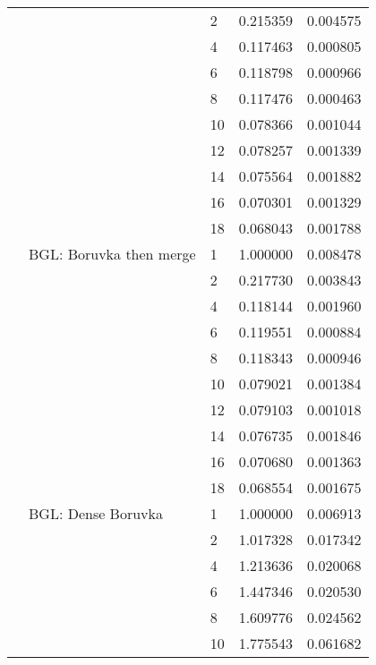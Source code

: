 \begin{tabular}{lllrr}
                      &            & 2  &  0.215359 &  0.004575 \\
                      &            & 4  &  0.117463 &  0.000805 \\
                      &            & 6  &  0.118798 &  0.000966 \\
                      &            & 8  &  0.117476 &  0.000463 \\
                      &            & 10 &  0.078366 &  0.001044 \\
                      &            & 12 &  0.078257 &  0.001339 \\
                      &            & 14 &  0.075564 &  0.001882 \\
                      &            & 16 &  0.070301 &  0.001329 \\
                      &            & 18 &  0.068043 &  0.001788 \\
                      & BGL: Boruvka then merge & 1  &  1.000000 &  0.008478 \\
                      &            & 2  &  0.217730 &  0.003843 \\
                      &            & 4  &  0.118144 &  0.001960 \\
                      &            & 6  &  0.119551 &  0.000884 \\
                      &            & 8  &  0.118343 &  0.000946 \\
                      &            & 10 &  0.079021 &  0.001384 \\
                      &            & 12 &  0.079103 &  0.001018 \\
                      &            & 14 &  0.076735 &  0.001846 \\
                      &            & 16 &  0.070680 &  0.001363 \\
                      &            & 18 &  0.068554 &  0.001675 \\
                      & BGL: Dense Boruvka & 1  &  1.000000 &  0.006913 \\
                      &            & 2  &  1.017328 &  0.017342 \\
                      &            & 4  &  1.213636 &  0.020068 \\
                      &            & 6  &  1.447346 &  0.020530 \\
                      &            & 8  &  1.609776 &  0.024562 \\
                      &            & 10 &  1.775543 &  0.061682 \\

\end{tabular}
